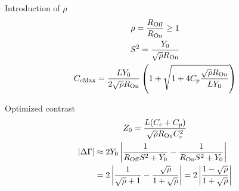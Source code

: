 \documentclass[../main.tex]{subfiles}
\begin{document}
\begin{frame}{Introduction of \(\rho\)}
\begin{gather*}
    \rho = \frac{R_{\text{Off}}}{R_{\text{On}}} \geq 1\\
    S^2 = \frac{Y_{0}}{\sqrt{\rho}R_{\text{On}}}\\
    C_{c\text{Max}} = \frac{L Y_{0}}{2\sqrt{\rho}R_{\text{On}}}
    \left(1 + \sqrt{1 + 4C_{p}\frac{\sqrt{\rho}R_{\text{On}}}{LY_{0}}}\right)
\end{gather*}
\end{frame}

%
%
%
%

\begin{frame}{Optimized contrast}
\begin{gather*}
    Z_{0} = \frac{L(C_{c}+C_{p})}{\sqrt{\rho}R_{\text{On}} C_{c}^2}\\
\begin{split}
    |\Delta\Gamma| &\approx 2Y_{0}\left|\frac{1}{
                   R_{\text{Off}} S^2 + Y_{0}} - \frac{1}{R_{\text{On}} S^2 + Y_{0}
               }\right|\\
                   &= 2\left|
                   \frac{1}{\sqrt\rho + 1} - \frac{\sqrt\rho}{1 + \sqrt\rho}
                   \right|
                   = 2\left|
                   \frac{1 - \sqrt\rho}{1 + \sqrt\rho}
                   \right|
\end{split}
\end{gather*}
\end{frame}
\end{document}
